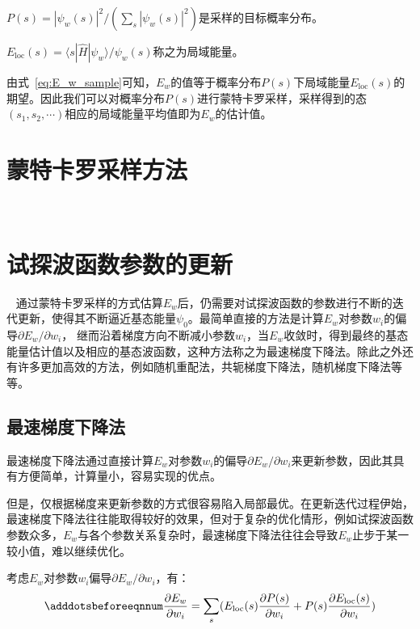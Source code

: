 $P(s)=|\psi_{w}(s)|^{2} /(\sum\limits_{s}|\psi_{w}(s)|^{2})$是采样的目标概率分布。

$E_{\text{loc}}(s)=\langle s|\hat{H}|\psi_{w}\rangle/\psi_{w}(s)$称之为局域能量。

由式~\eqref{eq:E_w_sample}可知，$E_w$的值等于概率分布$P(s)$下局域能量$E_{\text{loc}}(s)$的期望。因此我们可以对概率分布$P(s)$进行蒙特卡罗采样，采样得到的态$(s_1, s_2, \cdots)$相应的局域能量平均值即为$E_w$的估计值。

\section{蒙特卡罗采样方法} ~\label{sec:Monte_Carlo_sample_method}

\section{试探波函数参数的更新} ~\label{sec:update_trial_function_method}
通过蒙特卡罗采样的方式估算$E_w$后，仍需要对试探波函数的参数进行不断的迭代更新，使得其不断逼近基态能量$\psi_0$。最简单直接的方法是计算$E_w$对参数$w_i$的偏导$\partial E_{w}/\partial w_{i}$，
继而沿着梯度方向不断减小参数$w_i$，当$E_w$收敛时，得到最终的基态能量估计值以及相应的基态波函数，这种方法称之为最速梯度下降法。除此之外还有许多更加高效的方法，例如随机重配法\citep{sorella2001generalized}，共轭梯度下降法，随机梯度下降法等等。
\subsection{最速梯度下降法}
最速梯度下降法通过直接计算$E_w$对参数$w_i$的偏导$\partial E_{w}/\partial w_{i}$来更新参数，因此其具有方便简单，计算量小，容易实现的优点。

但是，仅根据梯度来更新参数的方式很容易陷入局部最优。在更新迭代过程伊始，最速梯度下降法往往能取得较好的效果，但对于复杂的优化情形，例如试探波函数
参数众多，$E_{w}$与各个参数关系复杂时，最速梯度下降法往往会导致$E_{w}$止步于某一较小值，难以继续优化。

考虑$E_w$对参数$w_i$偏导$\partial E_{w}/\partial w_{i}$，有：
\begin{equation} \label{eq:E_w_partial}
    \adddotsbeforeeqnnum%
    \frac{\partial E_w}{\partial w_i} = \sum_{s} (E_{\text{loc}}(s)\frac{\partial P(s)}{\partial w_i} + P(s)\frac{\partial E_{\text{loc}}(s)}{\partial w_i})
\end{equation}


